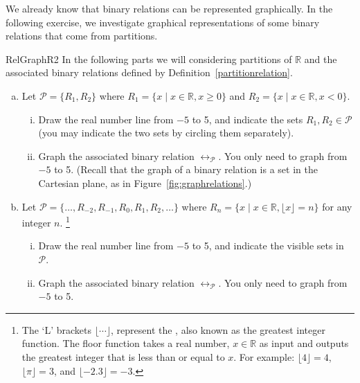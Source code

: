 We already know that binary relations can be represented graphically. In the following exercise, we investigate graphical representations of some binary relations that come from partitions.

\begin{exercise}{RelGraphR2}
In the following parts we will considering partitions of $\mathbb{R}$ and the associated binary relations defined by Definition~\ref{partitionrelation}. 
\begin{enumerate}[(a)]
\item Let $\mathcal{P}=\{R_1, R_2\}$ where $R_1=\{x \mid x \in \mathbb{R}, x \geq 0\}$ and $R_2=\{x \mid x \in \mathbb{R}, x < 0\}$.
\begin{enumerate}[(i)]
\item Draw the real number line from $-5$ to 5, and indicate the sets $R_1, R_2 \in \mathcal{P}$ (you may indicate the two sets by circling them separately).
\item Graph the associated binary relation $\rel_\mathcal{P}$. You only need to graph from $-5$ to 5. (Recall that the graph of a binary relation is a set in the Cartesian plane, as in Figure~\ref{fig:graphrelations}.)
\end{enumerate}

\item Let $\mathcal{P}=\{\ldots, R_{-2}, R_{-1}, R_0, R_1, R_2, \ldots \}$ where $R_n=\{x \mid x \in \mathbb{R}, \lfloor x \rfloor = n \}$ for any integer $n$. \footnote{The `L' brackets $\lfloor \cdots \rfloor$,  represent the , also known as the greatest integer function. The floor function takes a real number, $x \in \mathbb{R}$ as input and outputs the greatest integer that is less than or equal to $x$.  For example: $\lfloor 4 \rfloor = 4$, $\lfloor \pi \rfloor = 3$, and $\lfloor -2.3 \rfloor = -3$.}
\begin{enumerate}[(i)]
\item Draw the real number line from $-5$ to 5, and indicate the visible sets in $\mathcal{P}$.
\item Graph the associated binary relation $\rel_\mathcal{P}$. You only need to graph from $-5$ to 5.
\end{enumerate}


\end{enumerate}
\end{exercise}
